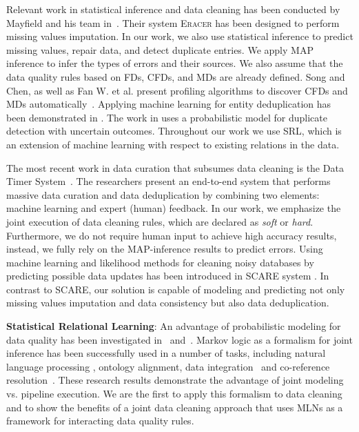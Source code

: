 Relevant work in statistical inference and data cleaning has been conducted by Mayfield and his team in~\cite{Mayfield:2010:EDA:1807167.1807178}. Their system \textsc{Eracer} has been designed to perform missing values imputation. In our work, we also use statistical inference to predict missing values, repair data, and detect duplicate entries. We apply MAP inference to infer the types of errors and their sources. We also assume that the data quality rules based on FDs, CFDs, and MDs are already defined. Song and Chen, as well as Fan W. et al. present profiling algorithms to discover CFDs and MDs automatically~\cite{song2009discovering,Fan:2011:DCF:1978258.1978514}. Applying machine learning for entity deduplication has been demonstrated in \cite{guo2010record}. The work in \cite{beskales2010probclean} uses a probabilistic model for duplicate detection with uncertain outcomes. Throughout our work we use SRL, which is an extension of machine learning with respect to existing relations in the data.

The most recent work in data curation that subsumes data cleaning is the Data Timer System~\cite{Stonebraker_datacuration}. The researchers present an end-to-end system that performs massive data curation and data deduplication by combining two elements: machine learning and expert (human) feedback. In our work, we emphasize the joint execution of data cleaning rules, which are declared as \textit{soft} or \textit{hard}. Furthermore, we do not require human input to achieve high accuracy results, instead, we fully rely on the MAP-inference results to predict errors. Using machine learning and likelihood methods for cleaning noisy databases by predicting possible data updates has been introduced in \textsc{SCARE} system \cite{Yakout:2013:DSU:2463676.2463706}. In contrast to \textsc{SCARE}, our solution is capable of modeling and predicting not only missing values imputation and data consistency but also data deduplication. 

\textbf{Statistical Relational Learning}: An advantage of probabilistic modeling for data quality has been investigated in~\cite{doi:10.1080/01621459.1972.10481323} and~\cite{chen2011usher}. Markov logic as a formalism for joint inference has been successfully used in a number of tasks, including natural language processing \cite{che2010jointly, riedel08collective, meza09jointly}, ontology alignment, data integration~\cite{niepert2011probabilistic} and co-reference resolution~\cite{poon2008joint,singla2006entity}. These research results demonstrate the advantage of joint modeling vs. pipeline execution. We are the first to apply this formalism to data cleaning and to show the benefits of a joint data cleaning approach that uses MLNs as a framework for interacting data quality rules. 

